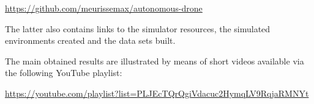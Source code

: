 \begin{center}
    \url{https://github.com/meurissemax/autonomous-drone}
\end{center}

The latter also contains links to the simulator resources, the simulated environments created and the data sets built.

The main obtained results are illustrated by means of short videos available via the following YouTube playlist:

\begin{center}
    \url{https://youtube.com/playlist?list=PLJEcTQrQgiVdacuc2HymqLV9RqjaRMNYt}
\end{center}
